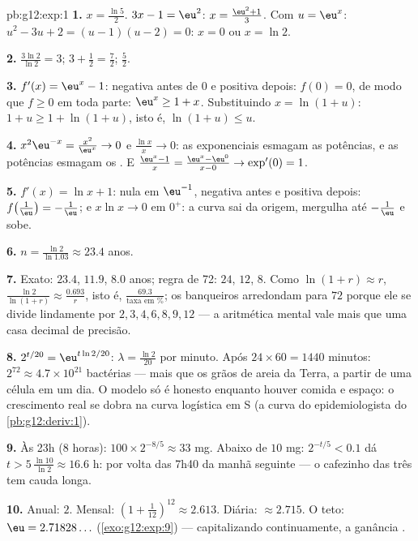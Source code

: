 \begin{solution}{pb:g12:exp:1}
\textbf{1.} $x = \frac{\ln 5}{2}$. \quad
$3x - 1 = \eu^2$: $x = \frac{\eu^2 + 1}{3}$. \quad Com
$u = \eu^x$: $u^2 - 3u + 2 = (u - 1)(u - 2) = 0$: $x = 0$ ou
$x = \ln 2$.

\textbf{2.} $\frac{3\ln 2}{\ln 2} = 3$; \quad
$3 + \frac12 = \frac72$; \quad $\frac52$.

\textbf{3.} $f'(x) = \eu^x - 1$: negativa antes de $0$ e
positiva depois:  $f(0) = 0$, de modo que $f \geq 0$ em
toda parte: $\eu^x \geq 1 + x$. Substituindo
$x = \ln(1 + u)$: $1 + u \geq 1 + \ln(1 + u)$, isto é,
$\ln(1 + u) \leq u$.

\textbf{4.} $x^2\eu^{-x} = \frac{x^2}{\eu^x} \to 0$ e
$\frac{\ln x}{x} \to 0$: as exponenciais esmagam as potências,
e as potências esmagam os . E
$\frac{\eu^x - 1}{x} = \frac{\eu^x - \eu^0}{x - 0} \to
\exp'(0) = 1$.

\textbf{5.} $f'(x) = \ln x + 1$: nula em $\eu^{-1}$, negativa
antes e positiva depois: 
$f\!\left(\frac1\eu\right) = -\frac1\eu$; e $x \ln x \to 0$ em
$0^+$: a curva sai da origem, mergulha até $-\frac1\eu$ e sobe.

\textbf{6.} $n = \frac{\ln 2}{\ln 1.03} \approx 23.4$ anos.

\textbf{7.} Exato: $23.4$, $11.9$, $8.0$ anos; regra de 72:
$24$, $12$, $8$. Como $\ln(1+r) \approx r$,
$\frac{\ln 2}{\ln(1+r)} \approx \frac{0.693}{r}$, isto é,
$\frac{69.3}{\text{taxa em }\%}$; os banqueiros arredondam para
$72$ porque ele se divide lindamente por $2, 3, 4, 6, 8, 9,
12$ --- a aritmética mental vale mais que uma casa decimal de
precisão.

\textbf{8.} $2^{t/20} = \eu^{t \ln 2 / 20}$:
$\lambda = \frac{\ln 2}{20}$ por minuto. Após
$24 \times 60 = 1440$ minutos:
$2^{72} \approx 4.7 \times 10^{21}$ bactérias --- mais que os
grãos de areia da Terra, a partir de uma célula em um dia. O
modelo só é honesto enquanto houver comida e espaço: o
crescimento real se dobra na curva logística em S (a curva do
epidemiologista do \cref{pb:g12:deriv:1}).

\textbf{9.} Às 23h ($8$ horas):
$100 \times 2^{-8/5} \approx 33$ mg. Abaixo de $10$ mg:
$2^{-t/5} < 0.1$ dá $t > 5\,\frac{\ln 10}{\ln 2} \approx
16.6$ h: por volta das 7h40 da manhã seguinte --- o cafezinho
das três tem cauda longa.

\textbf{10.} Anual: $2$. Mensal:
$\left(1 + \frac{1}{12}\right)^{12} \approx 2.613$. Diária:
$\approx 2.715$. O teto: $\eu = 2.71828\ldots$
(\cref{exo:g12:exp:9}) --- capitalizando continuamente, a
ganância .


\end{solution}
